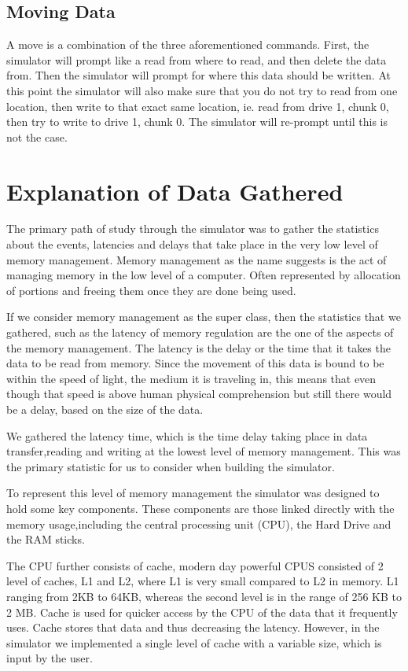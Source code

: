 \documentclass[12pt]{article}
\begin{document}
\subsection*{Moving Data}
A move is a combination of the three aforementioned commands. First, the simulator will prompt
like a read from where to read, and then delete the data from. Then the simulator will prompt
for where this data should be written. At this point the simulator will also make sure that
you do not try to read from one location, then write to that exact same location, ie. read
from drive 1, chunk 0, then try to write to drive 1, chunk 0. The simulator will re-prompt until
this is not the case. 
\section{Explanation of Data Gathered}
\label{sec:expstats}


The primary path of study through the simulator was to gather the statistics about the
events, latencies and delays that take place in the very low level of memory management.
Memory management as the name suggests is the act of managing memory in the low level of
a computer. Often represented by allocation of portions and freeing them once they are
done being used.

If we consider memory management as the super class, then the statistics that we gathered, such
as the latency of memory regulation are the one of the aspects of the memory management.
The latency is the delay or the time that it takes the data to be read from memory.
Since the movement of this data is bound to be within the speed of light,
the medium it is traveling in, this means that even though that speed is above human physical
comprehension but still there would be a delay, based on the size of the data.

We gathered the latency time, which is the time delay taking place in data transfer,reading and
writing at the lowest level of memory management. This was the primary statistic for us to consider
when building the simulator.

To represent this level of memory management the simulator was designed to hold some key components.
These components are those linked directly with the memory usage,including the
central processing unit (CPU), the Hard Drive and the RAM sticks.

The CPU further consists of cache, modern day powerful CPUS consisted of 2 level of caches, L1 and L2,
where L1 is very small compared to L2 in memory. L1 ranging from 2KB to 64KB, whereas the second level
is in the range of 256 KB to 2 MB. Cache is used for quicker access by the CPU of the data that it
frequently uses. Cache stores that data and thus decreasing the latency. However, in the simulator we
implemented a single level of cache with a variable size, which is input by the user.
\end{document}
